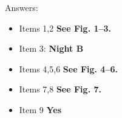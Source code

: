 
Answers:
\begin{itemize}
\item Items 1,2 \textbf{See Fig. 1--3.}
\item Item 3: \textbf{Night B}
\item Items 4,5,6 \textbf{See Fig. 4--6.}
\item Items 7,8 \textbf{See Fig. 7.}
\item Item 9 \textbf{Yes}
\end{itemize}

